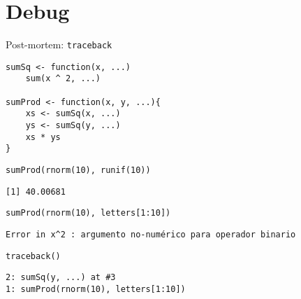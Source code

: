 \documentclass[xcolor={usenames,svgnames,dvipsnames}]{beamer}
\begin{document}
\section{Debug}
\label{sec:orgae6e940}

\begin{frame}[label={sec:org4d668ea},fragile]{Post-mortem: \texttt{traceback}}
 \lstset{language=r,label= ,caption= ,captionpos=b,numbers=none}
\begin{lstlisting}
sumSq <- function(x, ...)
    sum(x ^ 2, ...)

sumProd <- function(x, y, ...){
    xs <- sumSq(x, ...)
    ys <- sumSq(y, ...)
    xs * ys
}
\end{lstlisting}

\lstset{language=r,label= ,caption= ,captionpos=b,numbers=none}
\begin{lstlisting}
sumProd(rnorm(10), runif(10))
\end{lstlisting}

\begin{verbatim}
[1] 40.00681
\end{verbatim}


\lstset{language=r,label= ,caption= ,captionpos=b,numbers=none}
\begin{lstlisting}
sumProd(rnorm(10), letters[1:10])
\end{lstlisting}

\begin{verbatim}
Error in x^2 : argumento no-numérico para operador binario
\end{verbatim}


\lstset{language=r,label= ,caption= ,captionpos=b,numbers=none}
\begin{lstlisting}
traceback()
\end{lstlisting}

\begin{verbatim}
2: sumSq(y, ...) at #3
1: sumProd(rnorm(10), letters[1:10])
\end{verbatim}
\end{frame}
\end{document}
